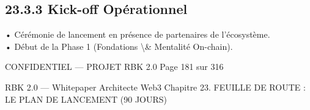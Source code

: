 \subsection{23.3.3 Kick-off Opérationnel}
• Cérémonie de lancement en présence de partenaires de l’écosystème.\\
\vspace{0.5em}
• Début de la Phase 1 (Fondations \textbackslash{}& Mentalité On-chain).\\
\vspace{0.5em}
\vspace{0.5em}
\vspace{0.5em}
\vspace{0.5em}
\begin{confidential}CONFIDENTIEL — PROJET RBK 2.0                                  Page 181 sur 316\end{confidential}
RBK 2.0 — Whitepaper Architecte Web3                                   Chapitre 23. FEUILLE DE ROUTE : LE PLAN DE LANCEMENT (90 JOURS)\\
\vspace{0.5em}
\vspace{0.5em}
\vspace{0.5em}
